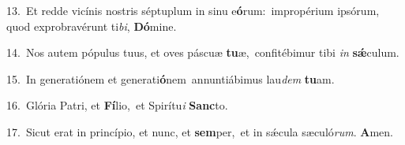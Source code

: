 {\numbfont\textcolor{\numbcolor}{13.}}~Et redde vicínis nostris séptuplum in sinu e\-\textbf{ó}\-rum:~\star impropérium ipsórum, quod exprobravérunt ti\-\textit{bi}\-, \textbf{Dó}\-mine.\par
{\numbfont\textcolor{\numbcolor}{14.}}~Nos autem pópulus tuus, et oves páscuæ \textbf{tu}\-æ,~\star confitébimur tibi \textit{in} \textbf{sǽ}\-culum.\par
{\numbfont\textcolor{\numbcolor}{15.}}~In generatiónem et generati\-\textbf{ó}\-nem~\star annuntiábimus lau\textit{dem} \textbf{tu}\-am.\par
{\numbfont\textcolor{\numbcolor}{16.}}~Glória Patri, et \textbf{Fí}\-lio,~\star et Spirítu\textit{i} \textbf{Sanc}\-to.\par
{\numbfont\textcolor{\numbcolor}{17.}}~Sicut erat in princípio, et nunc, et \textbf{sem}\-per,~\star et in sǽcula sæculó\-\textit{rum}\-. \textbf{A}\-men.\par
